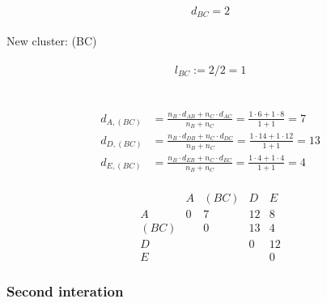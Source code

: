 \paragraph{\stepone}
\[
d_{BC} = 2
\]
\paragraph*{\steptwo}
New cluster: (BC) 
\paragraph*{\stepthree}
\[l_{BC} := 2 /2 = 1\] \\
\begin{center}
\end{center}
\paragraph*{\stepfour}
\begin{align*}
    d_{A, (BC)} & = \frac{n_{B} \cdot  d_{AB} + n_{C} \cdot  d_{AC}}{n_B + n_C}   = \frac{1 \cdot 6 + 1 \cdot 8}{1 + 1} = 7 \\
    d_{D, (BC)} & = \frac{n_{B} \cdot  d_{DB} + n_{C} \cdot  d_{DC}}{n_B + n_C}   = \frac{1 \cdot 14 + 1 \cdot 12}{1 + 1} = 13 \\
    d_{E, (BC)} & = \frac{n_{B} \cdot  d_{EB} + n_{C} \cdot  d_{EC}}{n_B + n_C}   = \frac{1 \cdot 4 + 1 \cdot 4}{1 + 1} = 4
\end{align*}
\paragraph*{\stepfive}
\[
\begin{array}{c|ccccc}
  & A & (BC) & D & E \\
\hline
A & 0& 7 & 12& 8 \\
(BC) &  & 0 & 13 & 4 \\
D &  &   & 0 & 12 \\
E &  &   &   & 0
\end{array}
\]
\subsubsection*{Second interation}
